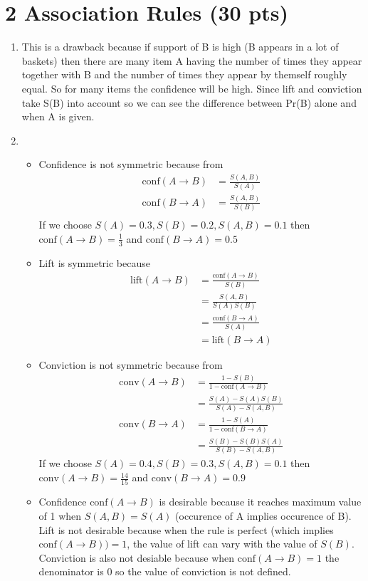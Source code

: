 \documentclass[12pt]{article}
\begin{document}
\section*{2 Association Rules (30 pts)}
\begin{enumerate}
	\item This is a drawback because if support of B is high (B appears in a lot of baskets) then there are many item A having the number of times they appear together with B and the number of times they appear by themself roughly equal. So for many items the confidence will be high. Since lift and conviction take S(B) into account so we can see the difference between Pr(B) alone and when A is given.
	\item 
	\begin{itemize}
		\item Confidence is not symmetric because from
		\begin{align*}
			\text{conf}(A \rightarrow B) &= \frac{S(A,B)}{S(A)} \\
			\text{conf}(B \rightarrow A) &= \frac{S(A,B)}{S(B)} \\
		\end{align*}
		If we choose $S(A) = 0.3, S(B) = 0.2, S(A,B) = 0.1$ then $\text{conf}(A \rightarrow B) = \frac{1}{3}$ and $\text{conf}(B \rightarrow A) = 0.5$
		\item Lift is symmetric because
		\begin{align*}
			\text{lift}(A \rightarrow B) &= \frac{\text{conf}(A \rightarrow B)}{S(B)} \\
			&=\frac{S(A, B)}{S(A)S(B)} \\
			&= \frac{\text{conf}(B \rightarrow A)}{S(A)} \\
			&= \text{lift}(B \rightarrow A)
		\end{align*}
		\item Conviction is not symmetric because from
		\begin{align*}
			\text{conv}(A \rightarrow B) &= \frac{1 - S(B)}{1 - \text{conf}(A \rightarrow B)} \\
			&= \frac{S(A) - S(A)S(B)}{S(A) - S(A, B)}
		\end{align*}
		\begin{align*}
			\text{conv}(B \rightarrow A) &= \frac{1 - S(A)}{1 - \text{conf}(B \rightarrow A)} \\
			&= \frac{S(B) - S(B)S(A)}{S(B) - S(A, B)}
		\end{align*}
		If we choose $S(A)=0.4, S(B)=0.3, S(A, B) = 0.1$ then $\text{conv}(A \rightarrow B) = \frac{14}{15}$ and $\text{conv}(B \rightarrow A) = 0.9$
		\item
		Confidence $\text{conf}(A \rightarrow B)$ is desirable because it reaches maximum value of 1 when $S(A, B) = S(A)$ (occurence of A implies occurence of B). \\
		Lift is not desirable because when the rule is perfect (which implies $\text{conf}(A \rightarrow B)) = 1$, the value of lift can vary with the value of $S(B)$. \\
		Conviction is also not desiable because when $\text{conf}(A \rightarrow B) = 1$ the denominator is 0 so the value of conviction is not defined.
	\end{itemize}
\end{enumerate}
\end{document}
